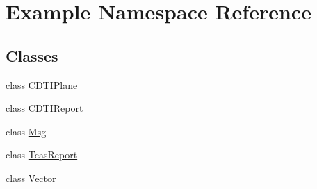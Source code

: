 \hypertarget{namespace_example}{}\section{Example Namespace Reference}
\label{namespace_example}
\subsection*{Classes}
\begin{DoxyCompactItemize}
\item 
class \hyperlink{class_example_1_1_c_d_t_i_plane}{C\+D\+T\+I\+Plane}
\item 
class \hyperlink{class_example_1_1_c_d_t_i_report}{C\+D\+T\+I\+Report}
\item 
class \hyperlink{class_example_1_1_msg}{Msg}
\item 
class \hyperlink{class_example_1_1_tcas_report}{Tcas\+Report}
\item 
class \hyperlink{class_example_1_1_vector}{Vector}
\end{DoxyCompactItemize}
